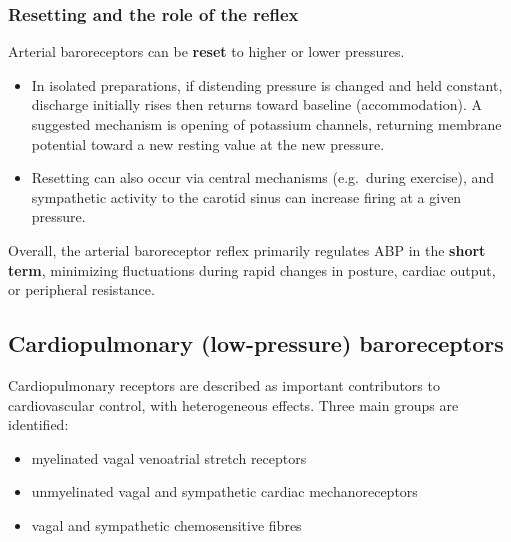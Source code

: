 \documentclass[11pt,a4paper]{article}
\begin{document}
\subsubsection{Resetting and the role of the reflex}
Arterial baroreceptors can be \textbf{reset} to higher or lower pressures.
\begin{itemize}
\item In isolated preparations, if distending pressure is changed and held constant, discharge initially rises then returns toward baseline (accommodation). A suggested mechanism is opening of potassium channels, returning membrane potential toward a new resting value at the new pressure.
\item Resetting can also occur via central mechanisms (e.g.\ during exercise), and sympathetic activity to the carotid sinus can increase firing at a given pressure.
\end{itemize}
Overall, the arterial baroreceptor reflex primarily regulates ABP in the \textbf{short term}, minimizing fluctuations during rapid changes in posture, cardiac output, or peripheral resistance.

\subsection{Cardiopulmonary (low-pressure) baroreceptors}
Cardiopulmonary receptors are described as important contributors to cardiovascular control, with heterogeneous effects. Three main groups are identified:
\begin{itemize}
\item myelinated vagal venoatrial stretch receptors
\item unmyelinated vagal and sympathetic cardiac mechanoreceptors
\item vagal and sympathetic chemosensitive fibres
\end{itemize}
\end{document}
